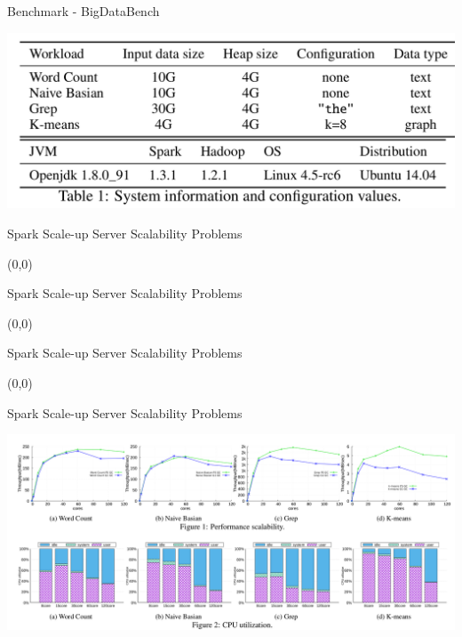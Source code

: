 \documentclass[english]{beamer} %
\begin{document}
\begin{frame}{Benchmark - BigDataBench}
\begin{center}
\includegraphics[scale=0.5]{fig/benchmark}
\end{center}
\end{frame}

\begin{frame}{Spark Scale-up Server Scalability Problems}
\begin{textblock}{1}(0,0)
\end{textblock} 
\end{frame}

\begin{frame}{Spark Scale-up Server Scalability Problems}
\begin{textblock}{1}(0,0)
\end{textblock} 
\end{frame}

\begin{frame}{Spark Scale-up Server Scalability Problems}
\begin{textblock}{1}(0,0)
\end{textblock} 
\end{frame}

\begin{frame}{Spark Scale-up Server Scalability Problems}
\begin{center}
\includegraphics[scale=0.3]{fig/scale-up-p}
\end{center}
\end{frame}
\end{document}
